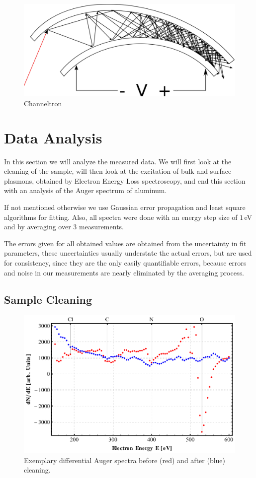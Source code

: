 \documentclass[a4paper,10pt]{scrartcl}
\begin{document}
\begin{figure}
\centering
\includegraphics[scale=0.25]{img/channeltron}
\caption{Channeltron \label{fig:ct}}
\end{figure}

\section{Data Analysis}

In this section we will analyze the measured data. We will first look at the cleaning of the sample, will then look at the excitation of bulk and surface plasmons, obtained by Electron Energy Loss spectroscopy, and end this section with an analysis of the Auger spectrum of aluminum.

If not mentioned otherwise we use Gaussian error propagation and least square algorithms for fitting. Also, all spectra were done with an energy step size of $1\,$eV and by averaging over $3$ measurements.

The errors given for all obtained values are obtained from the uncertainty in fit parameters, these uncertainties usually understate the actual errors, but are used for consistency, since they are the only easily quantifiable errors, because errors and noise in our measurements are nearly eliminated by the averaging process.

\subsection{Sample Cleaning}

\begin{figure}
\centering
\includegraphics[scale=0.6]{img/cleaning}
\caption{Exemplary differential Auger spectra before (red) and after (blue) cleaning. \label{fig:cleaning}}
\end{figure}
\end{document}

